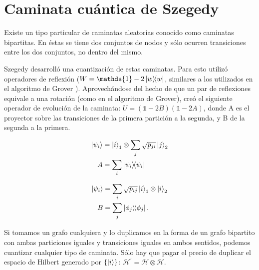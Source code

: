 \section{Caminata cuántica de Szegedy}

Existe un tipo particular de caminatas aleatorias conocido como caminatas bipartitas. En éstas se tiene dos conjuntos de nodos y sólo ocurren transiciones entre los dos conjuntos, no dentro del mismo.

Szegedy desarrolló una cuantización de estas caminatas. Para esto utilizó operadores de reflexión ($W = \mathds{1} - 2 \ketbra{w}{w}$, similares a los utilizados en el algoritmo de Grover \cite{Magniez_2011}). Aprovechándose del hecho de que un par de reflexiones equivale a una rotación (como en el algoritmo de Grover), creó el siguiente operador de evolución de la caminata: $U = (\mathds{1} - 2 B)(\mathds{1} - 2 A)$, donde A es el proyector sobre las transiciones de la primera partición a la segunda, y B de la segunda a la primera.

\begin{minipage}{0.5\linewidth}
\begin{align*}
\ket{\psi_i} &= \ket{i}_1 \otimes \sum\limits_j \sqrt{p_{j i}} \ket{j}_2 \\
A &= \sum\limits_i \ketbra{\psi_i}{\psi_i}
\end{align*}
\end{minipage}
\begin{minipage}{0.5\linewidth}
\begin{align*}
\ket{\psi_i} &= \sum\limits_i \sqrt{p_{i j}} \ket{i}_1 \otimes \ket{i}_2 \\
B &= \sum\limits_j \ketbra{\phi_j}{\phi_j} .
\end{align*}
\end{minipage}

Si tomamos un grafo cualquiera y lo duplicamos en la forma de un grafo bipartito con ambas particiones iguales y transiciones iguales en ambos sentidos, podemos cuantizar cualquier tipo de caminata. Sólo hay que pagar el precio de duplicar el espacio de Hilbert generado por $\{\ket{i}\}$: $\mathcal{H}^\prime = \mathcal{H} \otimes \mathcal{H}$.

